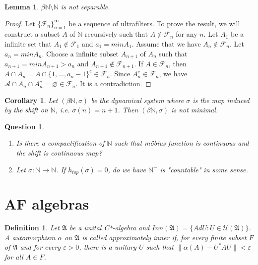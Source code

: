 \documentclass[a4paper,10pt]{amsart}
\newtheorem{corollary}{Corollary}[section]
\newtheorem{definition}{Definition}[section]
\newtheorem{lemma}{Lemma}[section]
\newtheorem{question}{Question}[section]
\newcommand{\AAA}{\mathfrak A}
\newcommand{\FFF}{\mathcal F}
\newcommand{\A}{\mathcal{A}}
\newcommand{\N}{\mathbb N} %
\begin{document}
\begin{lemma}
   $\beta \N \setminus \N$ is not separable. 
\end{lemma}
\begin{proof}
    Let $\{\FFF_n \}_{n=1}^{\infty}$ be a sequence of ultrafilters.
    To prove the result, we will construct a subset $A$ of $\N$ 
    recursively such that $A \notin \FFF_n$ for any $n$.
    Let $A_1$ be a infinite set that $A_1 \notin \FFF_1$ and 
    $a_1 = min A_{1}$. Assume that we have $A_n \notin \FFF_n$.
    Let $a_n = min A_{n}$. Choose a infinite subset $A_{n+1}$ of $A_n$ 
    such that $a_{n+1} = min A_{n+1} > a_n$ and $A_{n+1} \notin \FFF_{n+1}$.
    If $A \in \FFF_n$, then $A \cap A_n = 
    A \cap \{1, \ldots, a_n-1\}^{c} \in \FFF_n$. 
    Since $A_{n}^{c} \in \FFF_n$, we have $\A \cap A_n 
    \cap A_{n}^{c} = \varnothing \in \FFF_n$. It is a contradiction.
\end{proof}

\begin{corollary}
   Let $(\beta \N, \sigma)$ be the dynamical system where $\sigma$ is
   the map induced by the shift on $\N$, i.e. $\sigma(n) = n+1$. Then
   $(\beta \N, \sigma)$ is not minimal.
\end{corollary}


\begin{question}
    \begin{enumerate}
        \item Is there a compactification of $\N$ such that 
        m\"{o}bius function is continuous and the shift is continuous map?
        \item Let $\sigma: \N \rightarrow \N$. If $h_{top}(\sigma) = 0$, do 
            we have $\N^{-}$ is "countable" in some sense.
    \end{enumerate}
\end{question}

\section{AF algebras}
\begin{definition}
    Let $\AAA$ be a unital C*-algebra and 
    $Inn(\AAA) = \{ Ad U : U \in \mathcal{U}(\AAA)\}$.
    A automorphism $\alpha$ on $\AAA$ is called approximately 
    inner if, for every finite subset $F$ of $\AAA$ and 
    for every $\varepsilon > 0$, there is a unitary $U$ such that
    $\| \alpha(A) - U^{*}AU \| < \varepsilon$ for all $A \in F$.
\end{definition}
\end{document}
